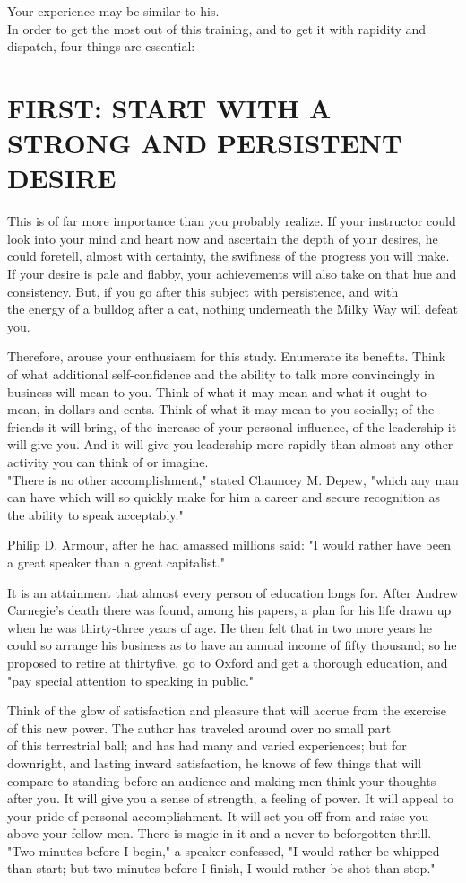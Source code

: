 \documentclass[10pt]{article}
\begin{document}
Your experience may be similar to his.\\
In order to get the most out of this training, and to get it with rapidity and dispatch, four things are essential:

\section*{FIRST: START WITH A STRONG AND PERSISTENT DESIRE}
This is of far more importance than you probably realize. If your instructor could look into your mind and heart now and ascertain the depth of your desires, he could foretell, almost with certainty, the swiftness of the progress you will make. If your desire is pale and flabby, your achievements will also take on that hue and consistency. But, if you go after this subject with persistence, and with\\
the energy of a bulldog after a cat, nothing underneath the Milky Way will defeat you.

Therefore, arouse your enthusiasm for this study. Enumerate its benefits. Think of what additional self-confidence and the ability to talk more convincingly in business will mean to you. Think of what it may mean and what it ought to mean, in dollars and cents. Think of what it may mean to you socially; of the friends it will bring, of the increase of your personal influence, of the leadership it will give you. And it will give you leadership more rapidly than almost any other activity you can think of or imagine.\\
"There is no other accomplishment," stated Chauncey M. Depew, "which any man can have which will so quickly make for him a career and secure recognition as the ability to speak acceptably."

Philip D. Armour, after he had amassed millions said: "I would rather have been a great speaker than a great capitalist."

It is an attainment that almost every person of education longs for. After Andrew Carnegie's death there was found, among his papers, a plan for his life drawn up when he was thirty-three years of age. He then felt that in two more years he could so arrange his business as to have an annual income of fifty thousand; so he proposed to retire at thirtyfive, go to Oxford and get a thorough education, and "pay special attention to speaking in public."

Think of the glow of satisfaction and pleasure that will accrue from the exercise of this new power. The author has traveled around over no small part\\
of this terrestrial ball; and has had many and varied experiences; but for downright, and lasting inward satisfaction, he knows of few things that will compare to standing before an audience and making men think your thoughts after you. It will give you a sense of strength, a feeling of power. It will appeal to your pride of personal accomplishment. It will set you off from and raise you above your fellow-men. There is magic in it and a never-to-beforgotten thrill. "Two minutes before I begin," a speaker confessed, "I would rather be whipped than start; but two minutes before I finish, I would rather be shot than stop."
\end{document}
